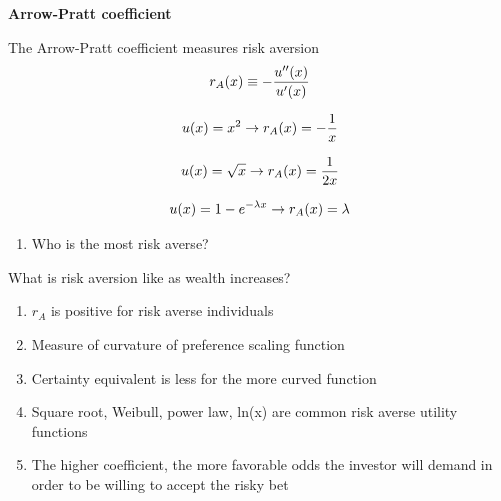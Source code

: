 \documentclass[aspectratio=1610,pdftex,dvipsnames,compress,xcolor={dvipsnames}]{beamer}
\begin{document}
\begin{frame}[plain]{}
    \centering\LARGE\textbf{Arrow-Pratt coefficient}
\end{frame}


\addtocounter{framenumber}{-1}
\begin{frame}{The Arrow-Pratt coefficient measures risk aversion}
    \begin{equation}
        \LARGE
        r_A(x) \equiv -\frac{u''(x)}{u'(x)}
    \end{equation}

    \begin{equation}
        \LARGE
        u(x)=x^2 \rightarrow r_A(x) = -\frac{1}{x}
    \end{equation}

    \begin{equation}
        \LARGE
        u(x)=\sqrt{x} \rightarrow r_A(x) = \frac{1}{2x}
    \end{equation}

    \begin{equation}
        \LARGE
        u(x)=1-e^{-\lambda x} \rightarrow r_A(x) = \lambda
    \end{equation}

    \begin{enumerate}[series=outerlist,topsep=0pt,itemsep=5pt,leftmargin=*,label=(\arabic*)]
        \item[]Who is the most risk averse?
    \end{enumerate}
\end{frame}


\begin{frame}{What is risk aversion like as wealth increases?}
    \begin{enumerate}[series=outerlist,topsep=0pt,itemsep=21pt,leftmargin=*,label=(\arabic*)]
        \item[]$r_A$ is positive for risk averse individuals
        \item[]Measure of curvature of preference scaling function
        \item[]Certainty equivalent is less for the more curved function
        \item[]Square root, Weibull, power law, ln(x) are common risk averse utility functions
        \item[]The higher coefficient, the more favorable odds the investor will demand in order to be willing to accept the risky bet
    \end{enumerate}
\end{frame}
\end{document}
